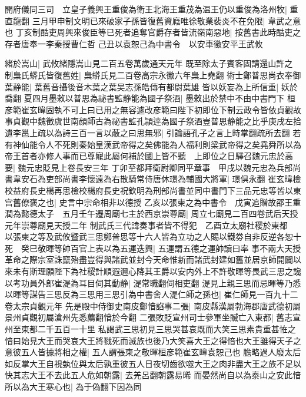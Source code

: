 開府儀同三司　立皇子義興王重俊為衛王北海王重茂為温王仍以重俊為洛州牧|{
	重直龍翻}
三月甲申制文明已來破家子孫皆復舊資廕唯徐敬業裴炎不在免限|{
	韋武之意也}
丁亥制酷吏周興來俊臣等已死者追奪官爵存者皆流嶺南惡地|{
	按舊書此時酷吏之存者唐奉一李秦授曹仁哲}
己丑以袁恕己為中書令　以安車徵安平王武攸

緒於嵩山|{
	武攸緒隱嵩山見二百五卷萬歲通天元年}
既至除太子賓客固請還山許之　制梟氏蟒氏皆復舊姓|{
	梟蟒氏見二百卷高宗永徽六年梟上堯翻}
術士鄭普思尚衣奉御葉静能|{
	葉舊音攝後音木葉之葉吴志孫皓傳有都尉葉雄}
皆以妖妄為上所信重|{
	妖於喬翻}
夏四月墨敕以普思為祕書監静能為國子祭酒|{
	墨敕出於禁中不由中書門下}
桓彦範崔玄暐固執不可上曰已用之無容遽改彦範曰陛下初即位下制云政令皆依貞觀故事貞觀中魏徵虞世南顔師古為祕書監孔頴逹為國子祭酒豈普思静能之比乎庚戌左拾遺李邕上疏以為詩三百一言以蔽之曰思無邪|{
	引論語孔子之言上時掌翻疏所去翻}
若有神仙能令人不死則秦始皇漢武帝得之矣佛能為人福利則梁武帝得之矣堯舜所以為帝王首者亦修人事而已尊寵此屬何補於國上皆不聽　上即位之日驛召魏元忠於高要|{
	魏元忠貶見上卷長安三年}
丁卯至都拜衛尉卿同平章事　甲戌以魏元忠為兵部尚書韋安石為吏部尚書李懷遠為右散騎常侍唐休璟為輔國大將軍|{
	璟俱永翻}
崔玄暐檢校益府長史楊再思檢校楊府長史祝欽明為刑部尚書並同中書門下三品元忠等皆以東宫舊僚褒之也|{
	史言中宗命相非以德授}
乙亥以張柬之為中書令　戊寅追贈故邵王重潤為懿德太子　五月壬午遷周廟七主於西京崇尊廟|{
	周立七廟見二百四卷武后天授元年崇尊廟見天授二年}
制武氏三代諱奏事者皆不得犯　乙酉立太廟社稷於東都　以張柬之等及武攸暨武三思鄭普思等十六人皆為立功之人賜以鐵劵自非反逆各恕十死　癸巳敬暉等帥百官上表以為五運迭興|{
	五運謂五德之運帥讀曰率}
事不兩大天授革命之際宗室誅竄殆盡豈得與諸武並封今天命惟新而諸武封建如舊並居京師開闢以來未有斯理願陛下為社稷計順遐邇心降其王爵以安内外上不許敬暉等畏武三思之讒以考功員外郎崔湜為耳目伺其動静|{
	湜常職翻伺相吏翻}
湜見上親三思而忌暉等乃悉以暉等謀告三思反為三思用三思引為中書舍人湜仁師之孫也|{
	崔仁師見一百九十二卷太宗貞觀元年}
先是殿中侍御史南皮鄭愔諂事二張|{
	南皮縣漢屬勃海郡唐武德初屬景州貞觀初屬滄州先悉薦翻愔於今翻}
二張敗貶宣州司士參軍坐贓亡入東都|{
	舊志宣州至東都二千五百一十里}
私謁武三思初見三思哭甚哀既而大笑三思素貴重甚恠之愔曰始見大王而哭哀大王將戮死而滅族也後乃大笑喜大王之得愔也大王雖得天子之意彼五人皆據將相之權|{
	五人謂張柬之敬暉桓彦範崔玄暐袁恕己也}
膽略過人廢太后如反掌大王自視埶位與太后孰重彼五人日夜切齒欲噬大王之肉非盡大王之族不足以快其志大王不去此五人危如朝露|{
	去羌呂翻朝露易晞}
而晏然尚自以為泰山之安此愔所以為大王寒心也|{
	為于偽翻下因為同}
